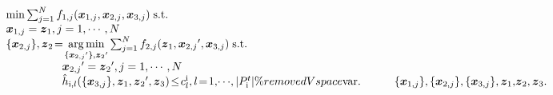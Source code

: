 \documentclass[letterpaper]{article} %
\begin{document}
\begin{equation}
\label{eq:4}
 \begin{array}{l}
\min \sum\nolimits_{j = 1}^N {{f_{1,j}}({\boldsymbol{x}_{1,j}},{\boldsymbol{x}_{2,j}},{\boldsymbol{x}_{3,j}})} \;{\rm{s}}.{\rm{t}}. \\

 {\boldsymbol{x}_{1,j}} = {\boldsymbol{z}_1},j = 1, \cdots ,N \\

 \{ {\boldsymbol{x}_{2,j}}\} ,{\boldsymbol{z}_2} \!=\! \mathop {\arg \min }\limits_{\{ {\boldsymbol{x}_{2,j}}'\} ,{\boldsymbol{z}_2}'} \sum\nolimits_{j = 1}^N {{f_{2,j}}({\boldsymbol{z}_1},{\boldsymbol{x}_{2,j}}',{\boldsymbol{x}_{3,j}})} \;{\rm{s}}.{\rm{t}}. \\

\qquad \qquad \quad   {\boldsymbol{x}_{2,j}}' = {\boldsymbol{z}_2}',j = 1, \cdots ,N \\

\qquad \qquad \quad   \hat{h}_{{\rm{\uppercase\expandafter{\romannumeral1}}},l}(\{{\boldsymbol{x}_{3,j}}\},\boldsymbol{z}_1, {\boldsymbol{z}_2}',\boldsymbol{z}_3 )  \!\le\! c_l^{\rm{\uppercase\expandafter{\romannumeral1}}},l \!=\! 1,\! \cdots\! ,|P_{\rm{\uppercase\expandafter{\romannumeral1}}}^{t}|\%removedVspace

{\mathop{\rm var}}. \qquad  \quad \{{\boldsymbol{x}_{1,j}}\} ,{\rm{\{ }}{\boldsymbol{x}_{2,j}}\} ,{\rm{\{ }}{\boldsymbol{x}_{3,j}}\} ,{\boldsymbol{z}_1}{\rm{,}}{\boldsymbol{z}_2},{\boldsymbol{z}_3}.
\end{array}
\end{equation}
\end{document}
